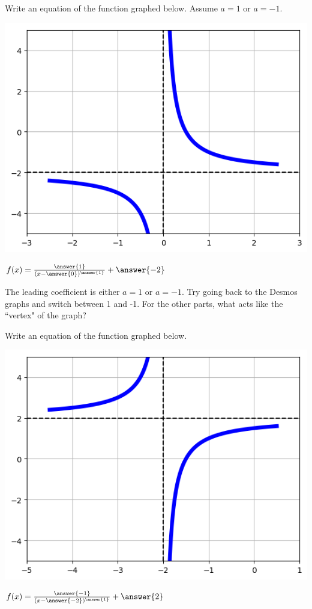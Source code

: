 \documentclass{ximera}
\begin{document}
\begin{question}
Write an equation of the function graphed below. Assume $a = 1$ or $a=-1$.

	\begin{center}
	    \includegraphics{graphRationalQ1.png}
	\end{center}

$f(x) = \frac{\answer{1}}{(x - \answer{0})^{\answer{1}}} + \answer{-2}$

\begin{hint}
The leading coefficient is either $a=1$ or $a=-1$. Try going back to the Desmos graphs and switch between 1 and -1. For the other parts, what acts like the ``vertex" of the graph?
\end{hint}
\end{question}

\begin{question}
Write an equation of the function graphed below. 

	\begin{center}
	    \includegraphics{graphRationalQ2.png}
	\end{center}

$f(x) = \frac{\answer{-1}}{(x - \answer{-2})^{\answer{1}}} + \answer{2}$
\end{question}
\end{document}
